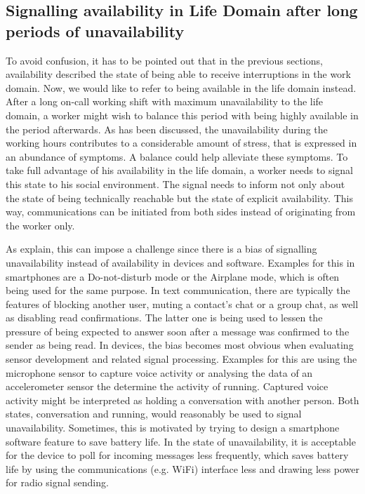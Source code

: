 \documentclass{CML_Seminar_Template}
\begin{document}
\subsection{Signalling availability in Life Domain after long periods of unavailability}
To avoid confusion, it has to be pointed out that in the previous sections, availability described the state of being able to receive interruptions in the work domain. Now, we would like to refer to being available in the life domain instead. After a long on-call working shift with maximum unavailability to the life domain, a worker might wish to balance this period with being highly available in the period afterwards. As has been discussed, the unavailability during the working hours contributes to a considerable amount of stress, that is expressed in an abundance of symptoms. A balance could help alleviate these symptoms. To take full advantage of his availability in the life domain, a worker needs to signal this state to his social environment. The signal needs to inform not only about the state of being technically reachable but the state of explicit availability. This way, communications can be initiated from both sides instead of originating from the worker only.
\par
As \cite[]{Fetter2018} explain, this can impose a challenge since there is a bias of signalling unavailability instead of availability in devices and software. Examples for this in smartphones are a Do-not-disturb mode or the Airplane mode, which is often being used for the same purpose. In text communication, there are typically the features of blocking another user, muting a contact's chat or a group chat, as well as disabling read confirmations. The latter one is being used to lessen the pressure of being expected to answer soon after a message was confirmed to the sender as being read. In devices, the bias becomes most obvious when evaluating sensor development and related signal processing. Examples for this are using the microphone sensor to capture voice activity or analysing the data of an accelerometer sensor the determine the activity of running. Captured voice activity might be interpreted as holding a conversation with another person. Both states, conversation and running, would reasonably be used to signal unavailability. Sometimes, this is motivated by trying to design a smartphone software feature to save battery life. In the state of unavailability, it is acceptable for the device to poll for incoming messages less frequently, which saves battery life by using the communications (e.g. WiFi) interface less and drawing less power for radio signal sending.
\end{document}
